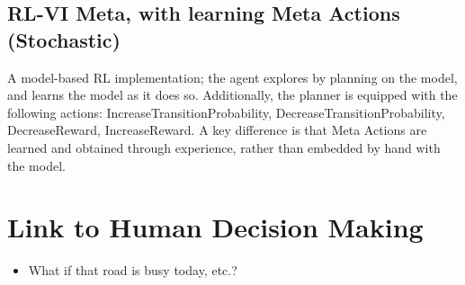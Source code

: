 \subsection{RL-VI Meta, with learning Meta Actions (Stochastic)}
A model-based RL implementation; the agent explores by planning on the model, and learns the model as it does so.
Additionally, the planner is equipped with the following actions: IncreaseTransitionProbability, DecreaseTransitionProbability, DecreaseReward, IncreaseReward. A key difference is that Meta Actions are learned and obtained through experience, rather than embedded by hand with the model.
\section{Link to Human Decision Making}
\begin{itemize}
    \item What if that road is busy today, etc.?
\end{itemize}